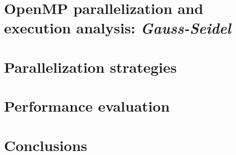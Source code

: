 \section{OpenMP parallelization and execution analysis: \emph{Gauss-Seidel}}

\section{Parallelization strategies}%
\label{sec:parallelization_strategies}

\section{Performance evaluation}%
\label{sec:performance_evaluation}

\section{Conclusions}%
\label{sec:conclusions}






